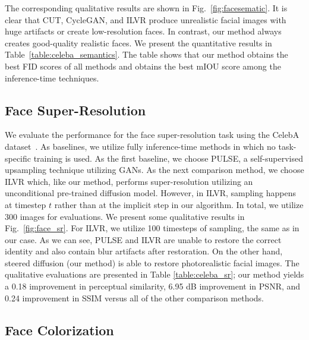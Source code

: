 \documentclass[10pt,twocolumn,letterpaper]{article}
\begin{document}
The corresponding qualitative results are shown in Fig.~\ref{fig:facesematic}. It is clear that CUT, CycleGAN, and ILVR produce unrealistic facial images with huge artifacts or create low-resolution faces. In contrast, our method always creates good-quality realistic faces. We present the quantitative results in Table~\ref{table:celeba_semantics}. The table shows that our method obtains the best FID scores of all methods and obtains the best mIOU score among the inference-time techniques. 


\subsection{Face Super-Resolution}





We evaluate the performance for the face super-resolution task using the CelebA dataset~\cite{liu2015faceattributes}. As baselines, we utilize fully inference-time methods in which no task-specific training is used. As the first baseline, we choose PULSE\cite{menon2020pulse}, a self-supervised upsampling technique utilizing GANs. As the next comparison method, we choose ILVR\cite{choi2021ilvr} which, like our method, performs super-resolution utilizing an unconditional pre-trained diffusion model. However, in ILVR, sampling happens at timestep $t$ rather than at the implicit step in our algorithm. In total, we utilize 300 images for evaluations. We present some qualitative results in Fig.~\ref{fig:face_sr}. For ILVR\cite{choi2021ilvr}, we utilize 100 timesteps of sampling, the same as in our case. As we can see, PULSE\cite{menon2020pulse} and ILVR\cite{choi2021ilvr} are unable to restore the correct identity and also contain blur artifacts after restoration. On the other hand, steered diffusion (our method) is able to restore photorealistic facial images. The qualitative evaluations are presented in Table \ref{table:celeba_sr}; our method yields a 0.18 improvement in perceptual similarity, 6.95 dB improvement in PSNR, and 0.24 improvement in SSIM versus all of the other comparison methods. 



\subsection{Face Colorization}
\end{document}
